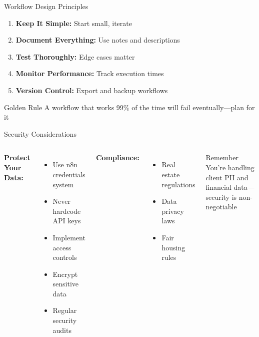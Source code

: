 \documentclass{beamer}
\begin{document}
\begin{frame}{Workflow Design Principles}
  \begin{enumerate}
    \item \textbf{Keep It Simple:} Start small, iterate
    \item \textbf{Document Everything:} Use notes and descriptions
    \item \textbf{Test Thoroughly:} Edge cases matter
    \item \textbf{Monitor Performance:} Track execution times
    \item \textbf{Version Control:} Export and backup workflows
  \end{enumerate}
  
  \vspace{0.3cm}
  
  \begin{block}{Golden Rule}
    A workflow that works 99\% of the time will fail eventually—plan for it
  \end{block}
\end{frame}

\begin{frame}{Security Considerations}
  \begin{columns}[onlytextwidth]
      \textbf{Protect Your Data:}
      \begin{itemize}
        \item Use n8n credentials system
        \item Never hardcode API keys
        \item Implement access controls
        \item Encrypt sensitive data
        \item Regular security audits
      \end{itemize}
      
      \textbf{Compliance:}
      \begin{itemize}
        \item Real estate regulations
        \item Data privacy laws
        \item Fair housing rules
      \end{itemize}
    
      \begin{block}{Remember}
        You're handling client PII and financial data—security is non-negotiable
      \end{block}
  \end{columns}
\end{frame}
\end{document}
